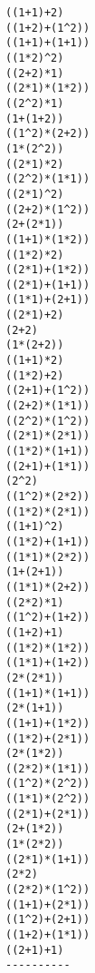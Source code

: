\documentclass{book}
\begin{document}
\begin{multicols}{2}
\begin{verbatim}
((1+1)+2)
((1+2)+(1^2))
((1+1)+(1+1))
((1*2)^2)
((2+2)*1)
((2*1)*(1*2))
((2^2)*1)
(1+(1+2))
((1^2)*(2+2))
(1*(2^2))
((2*1)*2)
((2^2)*(1*1))
((2*1)^2)
((2+2)*(1^2))
(2+(2*1))
((1+1)*(1*2))
((1*2)*2)
((2*1)+(1*2))
((2*1)+(1+1))
((1*1)+(2+1))
((2*1)+2)
(2+2)
(1*(2+2))
((1+1)*2)
((1*2)+2)
((2+1)+(1^2))
((2+2)*(1*1))
((2^2)*(1^2))
((2*1)*(2*1))
((1*2)*(1+1))
((2+1)+(1*1))
(2^2)
((1^2)*(2*2))
((1*2)*(2*1))
((1+1)^2)
((1*2)+(1+1))
((1*1)*(2*2))
(1+(2+1))
((1*1)*(2+2))
((2*2)*1)
((1^2)+(1+2))
((1+2)+1)
((1*2)*(1*2))
((1*1)+(1+2))
(2*(2*1))
((1+1)*(1+1))
(2*(1+1))
((1+1)+(1*2))
((1*2)+(2*1))
(2*(1*2))
((2*2)*(1*1))
((1^2)*(2^2))
((1*1)*(2^2))
((2*1)+(2*1))
(2+(1*2))
(1*(2*2))
((2*1)*(1+1))
(2*2)
((2*2)*(1^2))
((1+1)+(2*1))
((1^2)+(2+1))
((1+2)+(1*1))
((2+1)+1)
----------
\end{verbatim}
\end{multicols}
\end{document}
